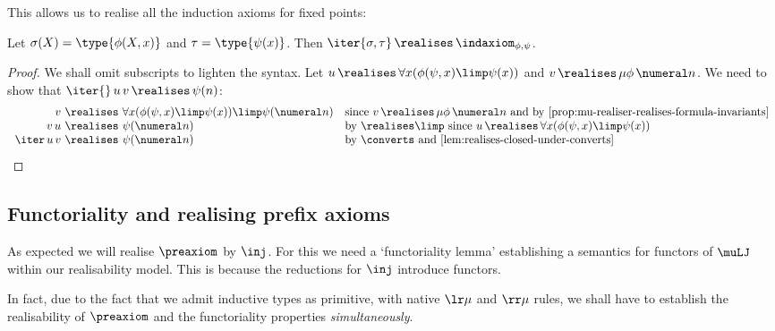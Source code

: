 This allows us to realise all the induction axioms for fixed points:
\begin{proposition}
    \label{prop:iter-realises-ind}
    Let $\sigma(X) = \type {\phi(X,x)}$ and $\tau = \type{\psi(x)}$. 
    Then  $\iter{\sigma,\tau}\, \realises\, \indaxiom_{\phi,\psi}$.
\end{proposition}
\begin{proof}
    We shall omit subscripts to lighten the syntax.
    Let $u\, \realises\, \forall x (\phi(\psi,x) \limp \psi(x))$ and $v \, \realises\, \mu\phi\, \numeral n$.
    We need to show that $\iter{}\, u\, v\, \realises\, \psi(n)$:
    \[
    \begin{array}[b]{r@{\ \realises\ }ll}
         v & \forall x (\phi(\psi,x) \limp \psi(x)) \limp \psi(\numeral n) & \text{since $v\, \realises\, \mu\phi\, \numeral n$ and by \Cref{prop:mu-realiser-realises-formula-invariants}} \\
         v\, u & \psi(\numeral n) & \text{by $\realises\limp$ since $u\, \realises \, \forall x (\phi(\psi,x) \limp \psi(x))$}\\
         \iter\, u\, v & \psi(\numeral n) & \text{by $\converts$ and \Cref{lem:realises-closed-under-converts}}  \tag*{\qed}
    \end{array}
    \]
\renewcommand{\qed}{}
\end{proof}


\subsection{Functoriality and realising prefix axioms}

As expected we will realise $\preaxiom$ by $\inj$.
For this we need a `functoriality lemma' establishing a semantics for functors of $\muLJ$ within our realisability model.
This is because the reductions for $\inj$ introduce functors.

In fact, due to the fact that we admit inductive types as primitive, with native $\lr\mu$ and $\rr \mu$ rules, we shall have to establish the realisability of $\preaxiom$ and the functoriality properties \emph{simultaneously}.


